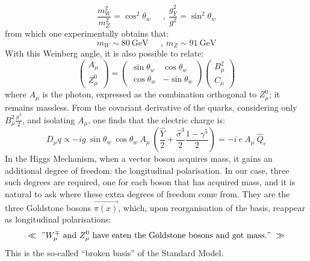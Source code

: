 \documentclass[11pt,a4paper,twoside,openright]{report}
\begin{document}
\begin{equation}
\frac{m_W^2}{m_Z^2}=\cos^2\theta_w\ \quad\ , \ \frac{g_Y^2}{g^2}=\sin^2\theta_w
\end{equation}
from which one experimentally obtains that:
\begin{equation}
m_W\sim 80\ \text{GeV}\ \quad\ , \ m_Z\sim 91\ \text{GeV}
\end{equation}
With this Weinberg angle, it is also possible to relate:
\begin{equation}
\begin{pmatrix} A_\mu \\ Z^0_\mu \end{pmatrix} = \begin{pmatrix} \sin\theta_w & \cos\theta_w \\ \cos\theta_w & -\sin\theta_w \end{pmatrix} \begin{pmatrix} B_\mu^2 \\ C_\mu \end{pmatrix}
\end{equation}
where \(A_\mu\) is the photon, expressed as the combination orthogonal to \(Z^0_\mu\); it remains massless. From the covariant derivative of the quarks, considering only \(B^2_\mu \frac{\hat{\sigma}^3}{2}\), and isolating \(A_\mu\), one finds that the electric charge is:
\begin{equation}
D_\mu q\propto-ig\ \sin\theta_w\ \cos\theta_w\ A_\mu\ \left( \frac{\hat{Y}}{2} +\frac{\hat{\sigma}^3}{2}\frac{1-\gamma^5}{2} \right) = -i\ e\ A_\mu\ \hat{Q}_e
\end{equation}
In the Higgs Mechanism, when a vector boson acquires mass, it gains an additional degree of freedom: the longitudinal polarisation. In our case, three such degrees are required, one for each boson that has acquired mass, and it is natural to ask where these extra degrees of freedom come from. They are the three Goldstone bosons \(\overrightarrow{\pi(x)}\), which, upon reorganisation of the basis, reappear as longitudinal polarisations:
\[\ll\ "W^\mp_\mu\ \text{and}\ Z^0_\mu\ \text{have eaten the Goldstone bosons and got mass.}"\ \gg \]
This is the so-called ``broken basis'' of the Standard Model.
\end{document}
